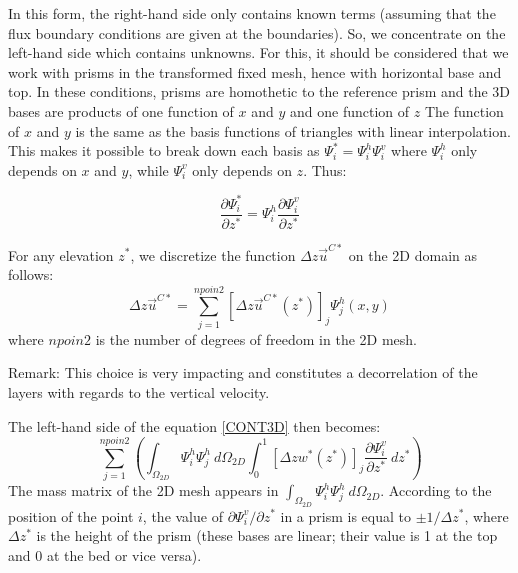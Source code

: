 In this form, the right-hand side only contains known terms (assuming that the
flux boundary conditions are given at the boundaries). So, we concentrate on
the left-hand side which contains unknowns. For this, it should be considered
that we work with prisms in the transformed fixed mesh, hence with horizontal
base and top. In these conditions, prisms are homothetic to the reference
prism and the 3D bases are products of one function of $x$ and $y$ and one
function of $z$ %
The function of $x$ and $y$ is the same as
the basis functions of triangles with linear interpolation. This makes it possible to
break down each basis as $\Psi_{i}^{\ast}=\Psi_{i}^{h}\Psi_{i}^{v}$ where $\Psi
_{i}^{h}$ only depends on $x$ and $y$, while $\Psi_{i}^{v}$ only depends on
$z$. Thus:%

\begin{equation}
\dfrac{\partial\Psi_{i}^{\ast}}{\partial z^{\ast}}=\Psi_{i}^{h}\dfrac
{\partial\Psi_{i}^{v}}{\partial z^{\ast}}%
\end{equation}

For any elevation $z^*$, we discretize the function $\Delta z\vec{u}^{C\ast}$ on the 2D domain as follows:%
\begin{equation}
\Delta z\vec{u}^{C\ast}=\sum\limits_{j=1}^{npoin2}\left[
\Delta z\vec{u}^{C\ast}(z^{\ast})\right]_{j}\Psi_{j}^{h}(x,y)
\end{equation}
where $npoin2$ is the number of degrees of freedom in the 2D mesh.

\begin{WarningBlock}{Remark:}
This choice is very impacting and constitutes a decorrelation of
the layers with regards to the vertical velocity.
\end{WarningBlock}

The left-hand side of the equation \ref{CONT3D} then becomes:%
\begin{equation}
\sum_{j=1}^{npoin2}\left(\int_{\Omega_{2D}}\Psi_{i}^{h}\Psi_{j}^{h}~d\Omega_{2D}
\int_{0}^{1}\left[\Delta zw^{\ast}(z^{\ast})\right]_{j}\dfrac{\partial\Psi_{i}^{v}}
{\partial z^{\ast}}~dz^{\ast}\right)
\end{equation}
The mass matrix of the 2D mesh appears in $\int_{\Omega_{2D}}\Psi_{i}^{h}\Psi_{j}^{h}~d\Omega_{2D}$.
According to the position of the point $i$, the value of $\partial
\Psi_{i}^{v}/\partial z^{\ast}$ in a prism is equal to $\pm 1/\Delta z^{\ast}$,
where $\Delta z^{\ast}$ is the height of the prism (these bases
are linear; their value is 1 at the top and 0 at the bed or vice versa).

